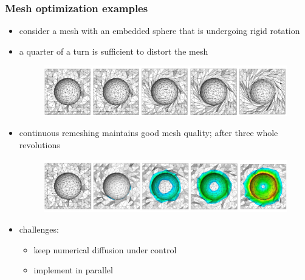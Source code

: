 \begin{frame}[fragile]
%
  \frametitle{Mesh optimization examples}
%
  \begin{itemize}
%
  \item consider a mesh with an embedded sphere that is undergoing rigid rotation
%
  \item a quarter of a turn is sufficient to distort the mesh
    \begin{figure}
      \includegraphics[scale=0.5]{figures/mesh-drag.pdf}
    \end{figure}
%
  \item continuous remeshing maintains good mesh quality; after three whole revolutions
    \begin{figure}
      \includegraphics[scale=0.5]{figures/mesh-draghealed.pdf}
    \end{figure}
%
  \item challenges:
    \begin{itemize}
    \item keep numerical diffusion under control
    \item implement in parallel
    \end{itemize}
%
  \end{itemize}
%
\end{frame}

